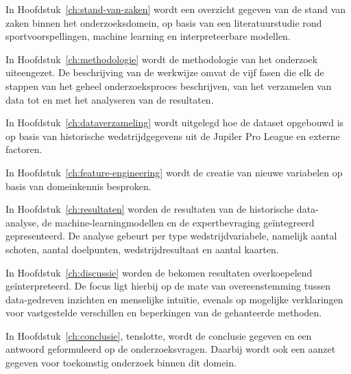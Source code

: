 In Hoofdstuk~\ref{ch:stand-van-zaken} wordt een overzicht gegeven van de stand van zaken binnen het onderzoeksdomein, 
op basis van een literatuurstudie rond sportvoorspellingen, machine learning en interpreteerbare modellen.

In Hoofdstuk~\ref{ch:methodologie} wordt de methodologie van het onderzoek uiteengezet. 
De beschrijving van de werkwijze omvat de vijf fasen die elk de stappen van het geheel onderzoeksproces beschrijven, 
van het verzamelen van data tot en met het analyseren van de resultaten.

In Hoofdstuk~\ref{ch:dataverzameling} wordt uitgelegd hoe de dataset opgebouwd is op basis van historische wedstrijdgegevens uit de Jupiler Pro League en externe factoren.

In Hoofdstuk~\ref{ch:feature-engineering} wordt de creatie van nieuwe variabelen op basis van domeinkennis besproken.

In Hoofdstuk~\ref{ch:resultaten} worden de resultaten van de historische data-analyse, de machine-learningmodellen en de expertbevraging geïntegreerd gepresenteerd. 
De analyse gebeurt per type wedstrijdvariabele, namelijk aantal schoten, aantal doelpunten, wedstrijdresultaat en aantal kaarten. 

In Hoofdstuk~\ref{ch:discussie} worden de bekomen resultaten overkoepelend geïnterpreteerd. 
De focus ligt hierbij op de mate van overeenstemming tussen data-gedreven inzichten en menselijke intuïtie, evenals op mogelijke verklaringen voor vastgestelde verschillen en beperkingen van de gehanteerde methoden.

In Hoofdstuk~\ref{ch:conclusie}, tenslotte, wordt de conclusie gegeven en een antwoord geformuleerd op de onderzoeksvragen. 
Daarbij wordt ook een aanzet gegeven voor toekomstig onderzoek binnen dit domein.